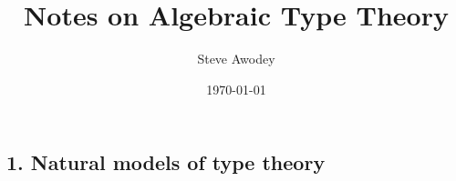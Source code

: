 \documentclass[12pt]{article}
\newcommand{\C}{\ensuremath{\mathbb{C}}}
\newcommand{\op}[1]{\ensuremath{{#1}^{\mathsf{op}}}}
\newcommand{\Set}{\ensuremath{\mathsf{Set}}}
\newcommand{\Cat}{\ensuremath{\mathsf{Cat}}}
\newcommand{\too}{\ensuremath{\longrightarrow}}
\theoremstyle{remark}
\theoremstyle{definition}
\begin{document}


\title{Notes on Algebraic Type Theory}
\author{Steve Awodey}
\date{\today}
\maketitle







\subsection*{1. Natural models of type theory}\label{sec:NaturalModels}
\end{document}
